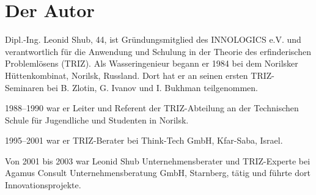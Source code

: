 \documentclass[11pt,a4paper]{article}
\begin{document}
\section*{Der Autor}

Dipl.-Ing. Leonid Shub, 44, ist Gründungsmitglied des INNOLOGICS e.V. und
verantwortlich für die Anwendung und Schulung in der Theorie des
erfinderischen Problemlösens (TRIZ).  Als Wasseringenieur begann er 1984 bei
dem Norilsker Hüttenkombinat, Norilsk, Russland. Dort hat er an seinen ersten
TRIZ-Seminaren bei B. Zlotin, G. Ivanov und I. Bukhman teilgenommen.

1988--1990 war er Leiter und Referent der TRIZ-Abteilung an der Technischen
Schule für Jugendliche und Studenten in Norilsk.

1995--2001 war er TRIZ-Berater bei Think-Tech GmbH, Kfar-Saba, Israel.

Von 2001 bis 2003 war Leonid Shub Unternehmensberater und TRIZ-Experte bei
Agamus Consult Unternehmensberatung GmbH, Starnberg, tätig und führte dort
Innovationsprojekte.
\end{document}
